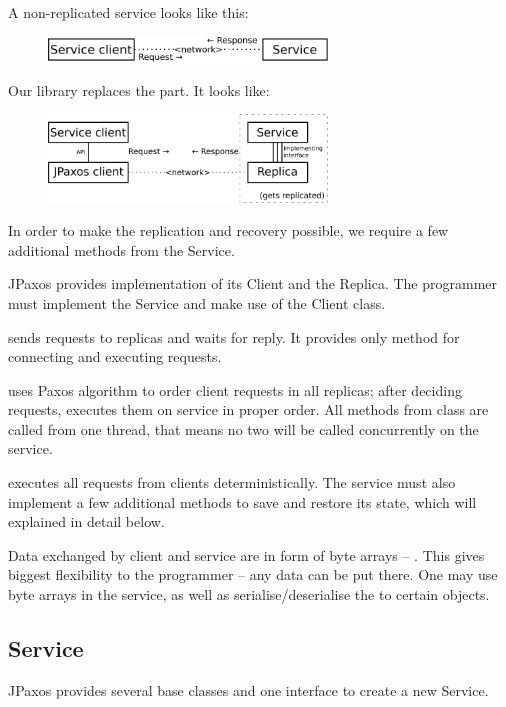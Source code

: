 A non-replicated service looks like this:
\begin{figure}[H]
\centering
\includegraphics[width=20em]{user_guide/api_sm.pdf}
\end{figure}

\noindent\ignorespaces Our library replaces the  part. It looks like:
\begin{figure}[H]
\centering
\includegraphics[width=20em]{user_guide/api_jpaxos.pdf}
\end{figure}

In order to make the replication and recovery possible, we require a few additional methods from the Service.

JPaxos provides implementation of its Client and the Replica. The programmer must implement the Service and make use of the Client class.

 sends requests to replicas and waits for reply. It provides only method for connecting and executing requests.

 uses Paxos algorithm to order client requests in all replicas; after deciding requests, executes them on service in proper order. All methods from  class are called from one  thread, that means no two will be called concurrently on the service.

 executes all requests from clients deterministically. The service must also implement a few additional methods to save and restore its state, which will explained in detail below.

Data exchanged by client and service are in form of byte arrays -- . This gives biggest flexibility to the programmer -- any data can be put there. One may use byte arrays in the service, as well as serialise/deserialise the  to certain objects.


\subsection{Service}
\label{api:service}
JPaxos provides several base classes and one interface to create a new Service.

